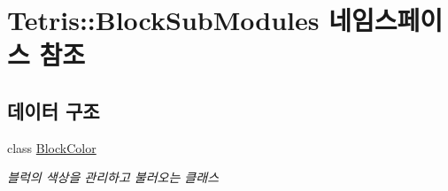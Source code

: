 \hypertarget{namespace_tetris_1_1_block_sub_modules}{}\section{Tetris\+:\+:Block\+Sub\+Modules 네임스페이스 참조}
\label{namespace_tetris_1_1_block_sub_modules}
\subsection*{데이터 구조}
\begin{DoxyCompactItemize}
\item 
class \hyperlink{class_tetris_1_1_block_sub_modules_1_1_block_color}{Block\+Color}
\begin{DoxyCompactList}\small\item\em 블럭의 색상을 관리하고 불러오는 클래스 \end{DoxyCompactList}\end{DoxyCompactItemize}
